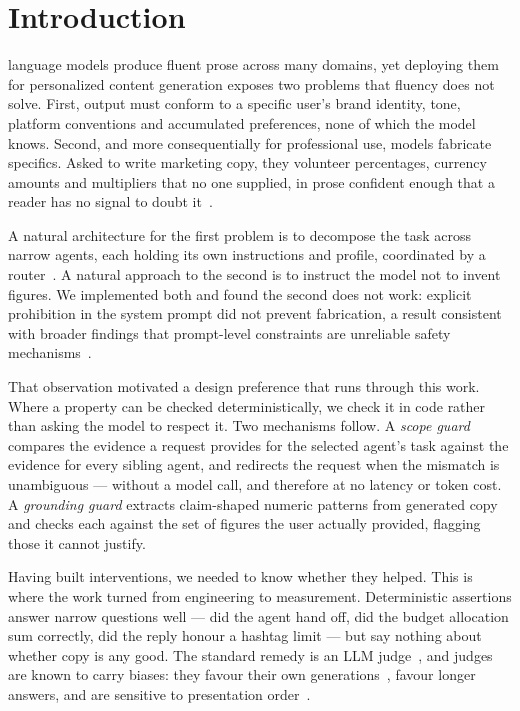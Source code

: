 \documentclass[journal]{IEEEtran}
\begin{document}
\section{Introduction}
 language models produce fluent prose across many
domains, yet deploying them for personalized content generation exposes two
problems that fluency does not solve. First, output must conform to a specific
user's brand identity, tone, platform conventions and accumulated preferences,
none of which the model knows. Second, and more consequentially for
professional use, models fabricate specifics. Asked to write marketing copy,
they volunteer percentages, currency amounts and multipliers that no one
supplied, in prose confident enough that a reader has no signal to doubt
it~\cite{ji2023hallucination}.

A natural architecture for the first problem is to decompose the task across
narrow agents, each holding its own instructions and profile, coordinated by a
router~\cite{wu2023autogen, langgraph2024}. A natural approach to the second is
to instruct the model not to invent figures. We implemented both and found the
second does not work: explicit prohibition in the system prompt did not prevent
fabrication, a result consistent with broader findings that prompt-level
constraints are unreliable safety mechanisms~\cite{rebedea2023nemo}.

That observation motivated a design preference that runs through this work.
Where a property can be checked deterministically, we check it in code rather
than asking the model to respect it. Two mechanisms follow. A \emph{scope
guard} compares the evidence a request provides for the selected agent's task
against the evidence for every sibling agent, and redirects the request when
the mismatch is unambiguous --- without a model call, and therefore at no
latency or token cost. A \emph{grounding guard} extracts claim-shaped numeric
patterns from generated copy and checks each against the set of figures the
user actually provided, flagging those it cannot justify.

Having built interventions, we needed to know whether they helped. This is
where the work turned from engineering to measurement. Deterministic assertions
answer narrow questions well --- did the agent hand off, did the budget
allocation sum correctly, did the reply honour a hashtag limit --- but say
nothing about whether copy is any good. The standard remedy is an LLM
judge~\cite{zheng2023judging, liu2023geval}, and judges are known to carry
biases: they favour their own generations~\cite{panickssery2024selfpref},
favour longer answers, and are sensitive to presentation
order~\cite{wang2023fair, koo2023benchmarking}.
\end{document}
